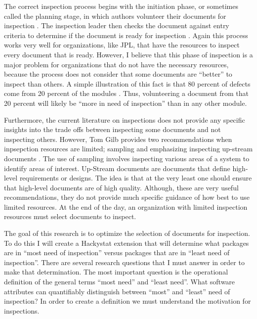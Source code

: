 The correct inspection process begins with the initiation phase, or
sometimes called the planning stage, in which authors volunteer their
documents for inspection \cite {Gilb93}. The inspection leader then checks
the document against entry criteria to determine if the document is ready
for inspection \cite{Ebenau94} \cite{Gilb93}. Again this process works very
well for organizations, like JPL, that have the resources to inspect every
document that is ready. However, I believe that this phase of inspection is
a major problem for organizations that do not have the necessary resources,
because the process does not consider that some documents are ``better'' to
inspect than others. A simple illustration of this fact is that 80 percent
of defects come from 20 percent of the modules \cite{Boehm01}.  Thus,
volunteering a document from that 20 percent will likely be ``more in need
of inspection'' than in any other module.

Furthermore, the current literature \cite{Ebenau94} \cite{Wiegers02}
\cite{Gilb93} on inspections does not provide any specific insights into
the trade offs between inspecting some documents and not inspecting others.
However, Tom Gilb provides two recommendations when inpsepction resources
are limited; sampling and emphasizing inspecting up-stream documents
\cite{Gilb93}. The use of sampling involves inspecting various areas of a
system to identify areas of interest. Up-Stream documents are documents
that define high-level requirements or designs. The idea is that at the
very least one should ensure that high-level documents are of high quality.
Although, these are very useful recommendations, they do not provide much
specific guidance of how best to use limited resources. At the end of the
day, an organization with limited inspection resources must select
documents to inspect.

The goal of this research is to optimize the selection of documents for
inspection. To do this I will create a Hackystat extension that will
determine what packages are in ``most need of inspection'' versus packages
that are in ``least need of inspection''. There are several research
questions that I must answer in order to make that determination. The most
important question is the operational definition of the general terms
``most need'' and ``least need''. What software attributes can quantifiably
distinguish between ``most'' and ``least'' need of inspection? In order to
create a definition we must understand the motivation for inspections.

